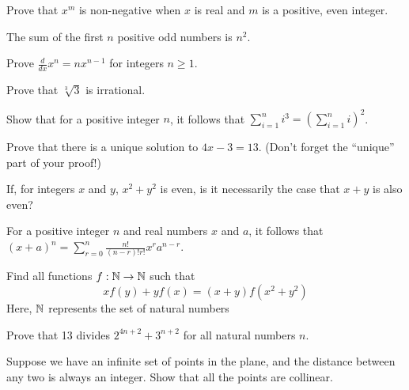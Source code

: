 \begin{exercise}
    Prove that $x^m$ is non-negative when $x$ is real and $m$ is a positive, even integer.
\end{exercise}
\vspace{-5mm}
\begin{exercise}
    The sum of the first $n$ positive odd numbers is $n^2$.
\end{exercise}
\vspace{-5mm}
\begin{exercise}[Calculus]
    Prove $\frac{d}{dx} x^n = nx^{n-1}$ for integers $n\geq 1$.
\end{exercise}
\vspace{-5mm}
\begin{exercise}
    Prove that $\sqrt[3]{3}$ is irrational.
\end{exercise}
\vspace{-5mm}
\begin{exercise}
    Show that for a positive integer $n$, it follows that $\sum_{i=1}^n i^3 = \left(\sum_{i=1}^n i\right)^2$.
\end{exercise}
\vspace{-5mm}
\begin{exercise}
    Prove that there is a unique solution to $4x-3=13$. (Don't forget the ``unique'' part of your proof!)
\end{exercise}
\vspace{-5mm}
\begin{exercise}
    If, for integers $x$ and $y$, $x^2+y^2$ is even, is it necessarily the case that $x+y$ is also even? 
\end{exercise}
\vspace{-5mm}
\begin{exercise}
    For a positive integer $n$ and real numbers $x$ and $a$, it follows that $(x+a)^n=\sum_{r=0}^n \frac{n!}{(n-r)!r!} x^r a^{n-r}$.
\end{exercise}
\vspace{-5mm}
\begin{exercise}
    Find all functions $f : \mathbb{N}\to\mathbb{N}$ such that $$xf(y)+yf(x)=(x+y)f(x^2+y^2)$$
    Here, $\mathbb{N}$ represents the set of natural numbers
\end{exercise}
\vspace{-5mm}
\begin{exercise}
    Prove that 13 divides $2^{4n+2}+3^{n+2}$ for all natural numbers $n$.
\end{exercise}
\vspace{-5mm}
\begin{exercise}
    Suppose we have an infinite set of points in the plane, and the distance between any two is always an integer. Show that all the points are collinear. 
\end{exercise}

